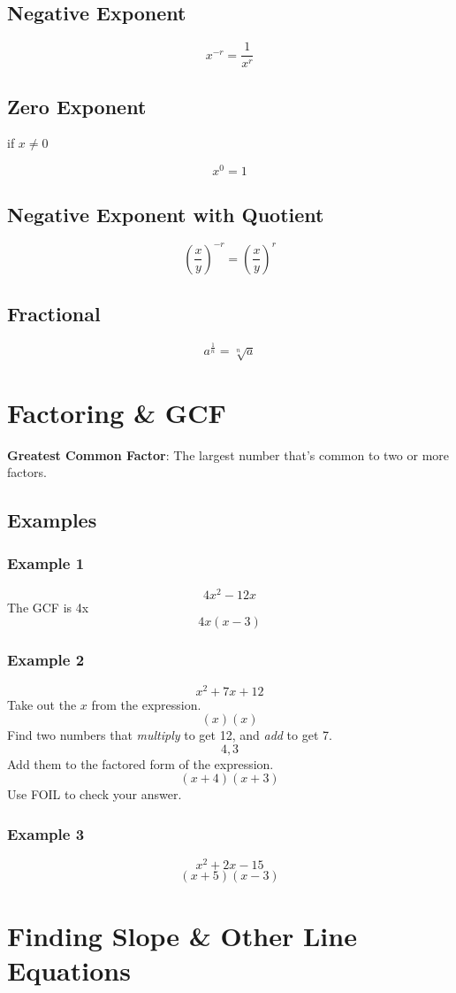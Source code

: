 \documentclass{article}
\begin{document}
\subsection{Negative Exponent}
	$$
	x^{-r} = \frac{1}{x^r}
	$$
\subsection{Zero Exponent}
	if $x \ne 0$

	$$x^0 = 1$$

\subsection{Negative Exponent with Quotient}
	$$
	\left( \frac{x}{y}\right)^{-r} = \left(\frac{x}{y}\right)^r
	$$

\subsection{Fractional}
	$$
	a^\frac{1}{n} = \sqrt[n]{a}	
	$$

\section{Factoring \& GCF}
\noindent \textbf{Greatest Common Factor}: The largest number that's common to two or more factors.
\subsection{Examples}
\subsubsection{Example 1}
$$4x^2 - 12x$$
The GCF is 4x
$$4x(x-3)$$

\subsubsection{Example 2}
$$x^2 + 7x + 12$$
Take out the $x$ from the expression.
$$(x)(x)$$
Find two numbers that \textit{multiply} to get 12, and \textit{add} to get 7.
$$4, 3$$
Add them to the factored form of the expression.
$$(x + 4)(x + 3)$$
Use FOIL to check your answer.

\subsubsection{Example 3}
$$x^2 + 2x - 15$$
$$(x+5)(x-3)$$

\section{Finding Slope \& Other Line Equations}
\end{document}

